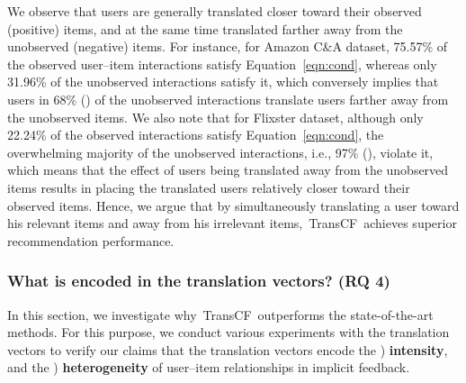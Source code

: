 \documentclass[conference]{IEEEtran}
\newcommand{\propose}{\textsf{{TransCF}}}
\begin{document}
We observe that users are generally translated closer toward their observed (positive) items, and at the same time translated farther away from the unobserved (negative) items. For instance, for Amazon C\&A dataset, 75.57\% of the observed user--item interactions satisfy Equation~\ref{eqn:cond}, whereas only 31.96\% of the unobserved interactions satisfy it, which conversely implies that users in 68\% () of the unobserved interactions translate users farther away from the unobserved items. We also note that for Flixster dataset, although only 22.24\% of the observed interactions satisfy Equation~\ref{eqn:cond}, the overwhelming majority of the unobserved interactions, i.e., 97\% (), violate it, which means that the effect of users being translated away from the unobserved items results in placing the translated users relatively closer toward their observed items.
Hence, we argue that by simultaneously translating a user toward his relevant items and away from his irrelevant items,~\propose~achieves superior recommendation performance.





\medskip
\subsubsection{\textbf{What is encoded in the translation vectors? (RQ 4)}}
\label{sec:int_het}
In this section, we investigate why~\propose~outperforms the state-of-the-art methods. For this purpose, we conduct various experiments with the translation vectors to verify our claims that the translation vectors encode 
the ) {\textbf{intensity}}, and the ) {\textbf{heterogeneity}} of user--item relationships in implicit feedback.
\end{document}
